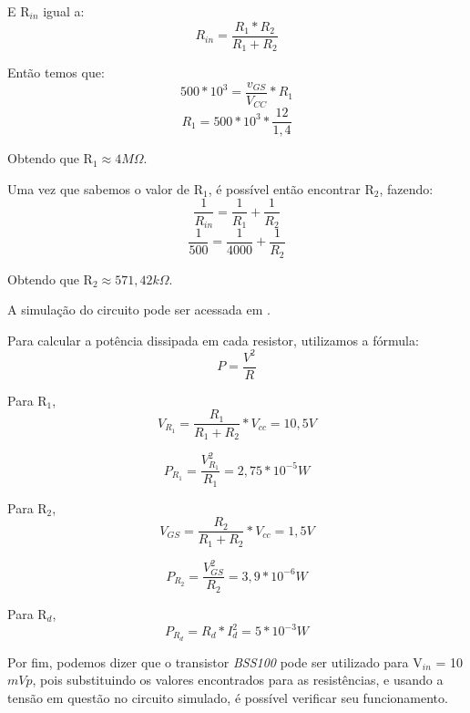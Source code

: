 \documentclass{article}
\begin{document}
E R$_{in}$ igual a:
\begin{equation}
    R_{in} = \frac{R_1 * R_2}{R_1 + R_2}
\end{equation}

Então temos que:
\begin{equation}
    500 * 10^3 = \frac{v_{GS}}{V_{CC}} * R_1
\end{equation}
\begin{equation}
    R_1 = 500*10^3 * \frac{12}{1,4}
\end{equation}

Obtendo que R$_1 \approx 4M\Omega$.
\newline

Uma vez que sabemos o valor de R$_1$, é possível então encontrar R$_2$, fazendo:
\begin{equation}
    \frac{1}{R_{in}} = \frac{1}{R_1} + \frac{1}{R_2}
\end{equation}
\begin{equation}
    \frac{1}{500} = \frac{1}{4000} + \frac{1}{R_2}
\end{equation}

Obtendo que R$_2 \approx 571,42k\Omega$.
\newline

A simulação do circuito pode ser acessada em \cite{ref:simu}.
\newline

Para calcular a potência dissipada em cada resistor, utilizamos a fórmula:
\begin{equation}
    P = \frac{V^2}{R}
\end{equation}

Para R$_1$,
\begin{equation}
    V_{R_1} = \frac{R_1}{R_1 + R_2} * V_{cc} = 10,5V
\end{equation}

\begin{equation}
    P_{R_1} = \frac{V_{R_1}^2}{R_1} = 2,75 * 10^{-5}W
\end{equation}

Para R$_2$,
\begin{equation}
    V_{GS} = \frac{R_2}{R_1 + R_2} * V_{cc} = 1,5V
\end{equation}

\begin{equation}
    P_{R_2} = \frac{V_{GS}^2}{R_2} = 3,9*10^{-6}W
\end{equation}

Para R$_d$,
\begin{equation}
    P_{R_d} = R_d * I_d^2 = 5*10^{-3}W
\end{equation}
\newline

Por fim, podemos dizer que o transistor \emph{BSS100} pode ser utilizado 
para V$_{in}$ = 10$mVp$, pois substituindo os valores encontrados para as resistências, e usando a tensão em questão no circuito simulado, é possível verificar seu funcionamento.



\nocite{*}


\end{document}
